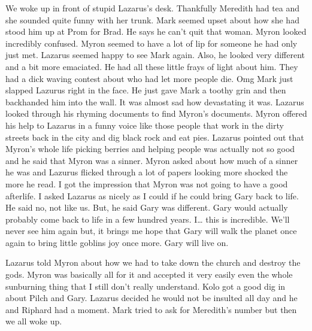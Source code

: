 \begin{multicols}{2}
We woke up in front of stupid Lazarus’s desk. Thankfully Meredith had tea and she sounded quite funny with her trunk. Mark seemed upset about how she had stood him up at Prom for Brad. He says he can’t quit that woman. Myron looked incredibly confused. Myron seemed to have a lot of lip for someone he had only just met. Lazarus seemed happy to see Mark again. Also, he looked very different and a bit more emaciated. He had all these little frays of light about him. They had a dick waving contest about who had let more people die. Omg Mark just slapped Lazurus right in the face. He just gave Mark a toothy grin and then backhanded him into the wall. It was almost sad how devastating it was. Lazarus looked through his rhyming documents to find Myron’s documents. Myron offered his help to Lazarus in a funny voice like those people that work in the dirty streets back in the city and dig black rock and eat pies. Lazarus pointed out that Myron’s whole life picking berries and helping people was actually not so good and he said that Myron was a sinner. Myron asked about how much of a sinner he was and Lazurus flicked through a lot of papers looking more shocked the more he read. I got the impression that Myron was not going to have a good afterlife. I asked Lazarus as nicely as I could if he could bring Gary back to life. He said no, not like us. But, he said Gary was different. Gary would actually probably come back to life in a few hundred years. I… this is incredible. We’ll never see him again but, it brings me hope that Gary will walk the planet once again to bring little goblins joy once more. Gary will live on.\medskip

Lazarus told Myron about how we had to take down the church and destroy the gods. Myron was basically all for it and accepted it very easily even the whole sunburning thing that I still don’t really understand. Kolo got a good dig in about Pilch and Gary. Lazarus decided he would not be insulted all day and he and Riphard had a moment. Mark tried to ask for Meredith’s number but then we all woke up.\medskip


\end{multicols}
